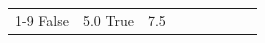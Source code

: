 \begin{table}[H]
\begin{tabular}{lllrlllll}
\cline{1-9}
False & 5.0%
\cline{1-9}
True & 7.5%

\end{tabular}
\end{table}

